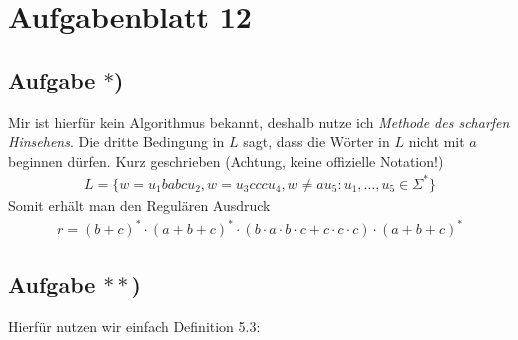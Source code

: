 
\section{Aufgabenblatt 12}
\subsection*{Aufgabe $\ast$)}
Mir ist hierfür kein Algorithmus bekannt, deshalb nutze ich \textit{Methode des scharfen Hinsehens}.
Die dritte Bedingung in $L$ sagt, dass die Wörter in $L$ nicht mit $a$ beginnen dürfen.
Kurz geschrieben (Achtung, keine offizielle Notation!)
\begin{align*}
	L=\Big\lbrace w=u_1 babc u_2,w=u_3 ccc u_4,w\neq a u_5:u_1,\ldots,u_5\in\Sigma^\ast\Big\rbrace
\end{align*}
Somit erhält man den Regulären Ausdruck 
\begin{align*}
	r=(b+c)^\ast\cdot(a+b+c)^\ast\cdot(b\cdot a\cdot b\cdot c+c\cdot c\cdot c)\cdot(a+b+c)^\ast
\end{align*}

\subsection*{Aufgabe $\ast\ast$)}
Hierfür nutzen wir einfach Definition 5.3:

